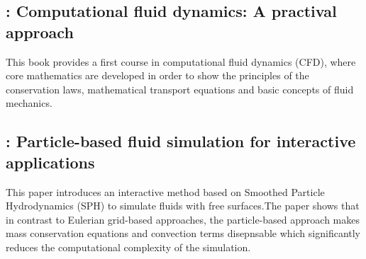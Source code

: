 \documentclass[11pt, a4paper]{article} %
\begin{document}
\subsection{\cite{Tu:2007}: Computational fluid dynamics: A practival approach}
This book provides a first course in computational fluid dynamics (CFD), where core mathematics are developed in order to  show the principles of the conservation laws, mathematical transport equations and basic concepts of fluid mechanics.

\subsection{\cite{Muller:2003}: Particle-based fluid simulation for interactive applications}
This paper introduces an interactive method based on Smoothed Particle Hydrodynamics (SPH) to simulate fluids with free surfaces.The paper shows that in contrast to Eulerian grid-based approaches, the particle-based approach makes mass conservation equations and convection terms disepnsable which significantly reduces the computational complexity of the simulation.


\end{document}
